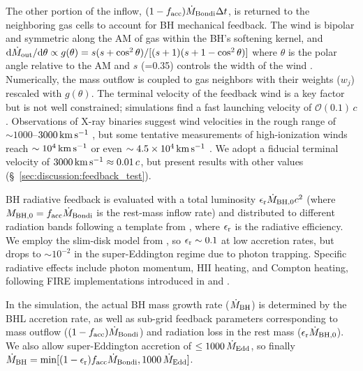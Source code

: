 \documentclass[twocolumn]{aastex631}
\begin{document}
The other portion of the inflow, $(1-f_{\rm acc})\dot M_{\rm Bondi} \Delta t$, is returned to the neighboring gas cells to account for BH mechanical feedback. The wind is bipolar and symmetric along the AM of gas within the BH's softening kernel, and $\dd \dot M_{\rm out}/\dd \theta \propto g (\theta) = s(s+\cos^2\theta)/[(s+1)(s+1-\cos^2\theta)]$ where $\theta$ is the polar angle relative to the AM and $s$ (=0.35) controls the width of the wind \citep{HopkinsTorreyFaucher-Giguere_2016MNRAS.458..816H}. Numerically, the mass outflow is coupled to gas neighbors with their weights ($w_j$) rescaled with $g(\theta)$. The terminal velocity of the feedback wind is a key factor but is not well constrained;  simulations \citep{ZhangStoneWhite_2026ApJ..1001..138Z} find a fast launching velocity of $\mathcal{O}(0.1)\,c$. Observations of X-ray binaries suggest wind velocities in the rough range of $\sim 1000$--$3000\,\rm km\,{s}^{-1}$ \citep{Munoz-DariasDiazTrigoDone_2026arXiv260105319M}, but some tentative measurements of high-ionization winds reach $\sim 10^4\,\rm km\,{s}^{-1}$ or even $\sim 4.5\times 10^4\,\rm km\,{s}^{-1}$ \citep{DelSantoPintoMarino_2023MNRAS.523L..15D}. We adopt a fiducial terminal velocity of $ 3000\,{\rm km\,{s}^{-1}} \approx 0.01\, c$, {but present results with other values (\S~\ref{sec:discussion:feedback_test}).}

BH radiative feedback is evaluated with a total luminosity {$\epsilon_{\rm r} \dot M_{\rm BH,0} c^2$ (where $M_{\rm BH,0}=f_{\rm acc} \dot M_{\rm Bondi}$ is the rest-mass inflow rate)} and distributed to different radiation bands following a template from \citet{ShenHopkinsFaucher-Giguere_2020MNRAS.495.3252S}, where $\epsilon_{\rm r}$ is the radiative efficiency. We employ the slim-disk model from \citep{MadauHaardtDotti_2014ApJ...784L..38M}, so $\epsilon_{\rm r} \sim 0.1$ at low accretion rates, but drops to $\sim 10^{-2}$ in the super-Eddington regime due to photon trapping. Specific radiative effects include photon momentum, HII heating, and Compton heating, following FIRE implementations introduced in \citet{HopkinsTorreyFaucher-Giguere_2016MNRAS.458..816H} and \citet{HopkinsWetzelKeres_2018MNRAS.480..800H}. 

{In the simulation, the actual BH mass growth rate ($\dot M_{\rm BH}$) is determined by the BHL accretion rate, as well as sub-grid feedback parameters corresponding to mass outflow ($(1-f_{\rm acc})\dot M_{\rm Bondi}$) and radiation loss in the rest mass ($\epsilon_{\rm r} \dot M_{\rm BH,0}$). We also allow super-Eddington accretion of $\le 1000\,\dot M_{\rm Edd}$, so finally $\dot M_{\rm BH} = \min [(1-\epsilon_{\rm r})f_{\rm acc}\dot M_{\rm Bondi}, 1000\,\dot M_{\rm Edd}]$.
}
\end{document}
